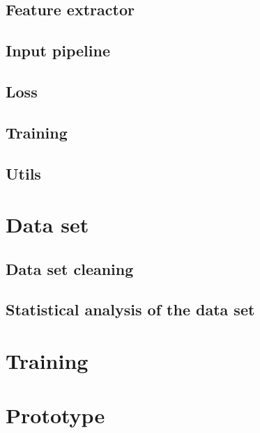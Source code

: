 \subsection{Feature extractor}
\label{sub:Component-Feature-Extractor}

\subsection{Input pipeline}
\label{sub:Component-Input-pipeline}

\subsection{Loss}
\label{sub:Component-Loss}

\subsection{Training}
\label{sub:Component-Training}

\subsection{Utils}
\label{sub:Component-Utils}

\section{Data set}
\label{sec:Data-Set}

\subsection{Data set cleaning}
\label{sub:Data-Set-Cleaning}

\subsection{Statistical analysis of the data set}
\label{sub:Statistical-Analysis-Data-Set}

\section{Training}
\label{sec:Training}

\section{Prototype}
\label{sec:Prototype}
